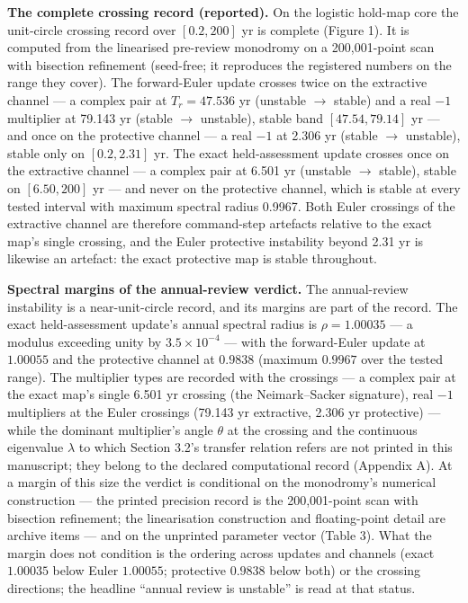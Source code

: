 \documentclass[11pt]{article}
\begin{document}
\textbf{The complete crossing record (reported).} On the logistic
hold-map core the unit-circle crossing record over \([0.2, 200]\) yr is
complete (Figure 1). It is computed from the linearised pre-review
monodromy on a 200,001-point scan with bisection refinement (seed-free;
it reproduces the registered numbers on the range they cover). The
forward-Euler update crosses twice on the extractive channel --- a
complex pair at \(T_r = 47.536\) yr (unstable \(\to\) stable) and a real
\(-1\) multiplier at 79.143 yr (stable \(\to\) unstable), stable band
\([47.54, 79.14]\) yr --- and once on the protective channel --- a real
\(-1\) at 2.306 yr (stable \(\to\) unstable), stable only on
\([0.2, 2.31]\) yr. The exact held-assessment update crosses once on the
extractive channel --- a complex pair at 6.501 yr (unstable \(\to\)
stable), stable on \([6.50, 200]\) yr --- and never on the protective
channel, which is stable at every tested interval with maximum spectral
radius 0.9967. Both Euler crossings of the extractive channel are
therefore command-step artefacts relative to the exact map's single
crossing, and the Euler protective instability beyond 2.31 yr is
likewise an artefact: the exact protective map is stable throughout.

\textbf{Spectral margins of the annual-review verdict.} The
annual-review instability is a near-unit-circle record, and its margins
are part of the record. The exact held-assessment update's annual
spectral radius is \(\rho = 1.00035\) --- a modulus exceeding unity by
\(3.5\times 10^{-4}\) --- with the forward-Euler update at \(1.00055\)
and the protective channel at \(0.9838\) (maximum \(0.9967\) over the
tested range). The multiplier types are recorded with the crossings ---
a complex pair at the exact map's single 6.501 yr crossing (the
Neimark--Sacker signature), real \(-1\) multipliers at the Euler
crossings (79.143 yr extractive, 2.306 yr protective) --- while the
dominant multiplier's angle \(\theta\) at the crossing and the
continuous eigenvalue \(\lambda\) to which Section 3.2's transfer
relation refers are not printed in this manuscript; they belong to the
declared computational record (Appendix A). At a margin of this size the
verdict is conditional on the monodromy's numerical construction --- the
printed precision record is the 200,001-point scan with bisection
refinement; the linearisation construction and floating-point detail are
archive items --- and on the unprinted parameter vector (Table 3). What
the margin does not condition is the ordering across updates and
channels (exact \(1.00035\) below Euler \(1.00055\); protective
\(0.9838\) below both) or the crossing directions; the headline ``annual
review is unstable'' is read at that status.
\end{document}
